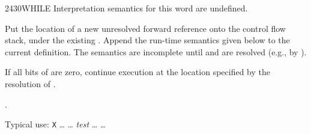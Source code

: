 \vspace*{-2ex}
\begin{worddef}{2430}{WHILE}
\interpret
	Interpretation semantics for this word are undefined.

\compile

	Put the location of a new unresolved forward reference
	 onto the control flow stack, under the existing
	. Append the run-time semantics given below to the
	current definition. The semantics are incomplete until
	 and  are resolved (e.g., by
	).

\runtime

	If all bits of  are zero, continue execution at the
	location specified by the resolution of .

\see {}.

	\begin{rationale} %
		Typical use:
			\word{:} \texttt{X} {\ldots}
				 {\ldots}
				\emph{test} 
				{\ldots} 
			{\ldots} \word{;}
	\end{rationale}

	\begin{testing} %
		 \\
		 \\
		 \\
		 \\

		 \\
		 \\
		 \\
		 \\
		 \\
	\end{testing}
\end{worddef}

